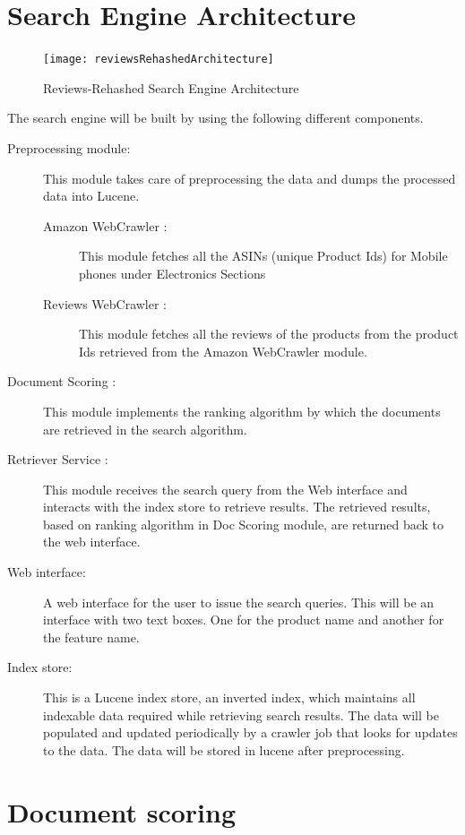 \documentclass{article}
\begin{document}
\section{Search Engine Architecture}
\begin{figure}[ht!]
  \centering
  \texttt{[image: reviewsRehashedArchitecture]}
  \caption{Reviews-Rehashed Search Engine Architecture\label{fig:Search_Engine}}
\end{figure}
The search engine will be built by using the following different components.
\begin{description}
  \item[Preprocessing module: ]  This module takes care of preprocessing the data and dumps the processed data into Lucene.
  \begin{description}
	 \item[Amazon WebCrawler : ] This module fetches all the ASINs (unique Product Ids) for Mobile phones under Electronics Sections
	 \item[Reviews WebCrawler : ] This module fetches all the reviews of the products from the product Ids retrieved from the Amazon WebCrawler module.
  \end{description}
  \item[Document Scoring : ] This module implements the ranking algorithm by which the documents are retrieved in the search algorithm.
  \item[Retriever Service : ] This module receives the search query from the Web interface and interacts with the index store to retrieve results. The retrieved results, based on ranking algorithm in Doc Scoring module, are returned back to the web interface.
  \item[Web interface:] A web interface for the user to issue the search queries.  This will be an interface with two text boxes. One for the product name and another for the feature name.
  \item[Index store:]  This is a Lucene index store, an inverted index, which maintains all indexable data required while retrieving search results.  The data will be populated and updated periodically by a crawler job that looks for updates to the data.  The data will be stored in lucene after preprocessing.
\end{description}

\section{Document scoring}
\end{document}
